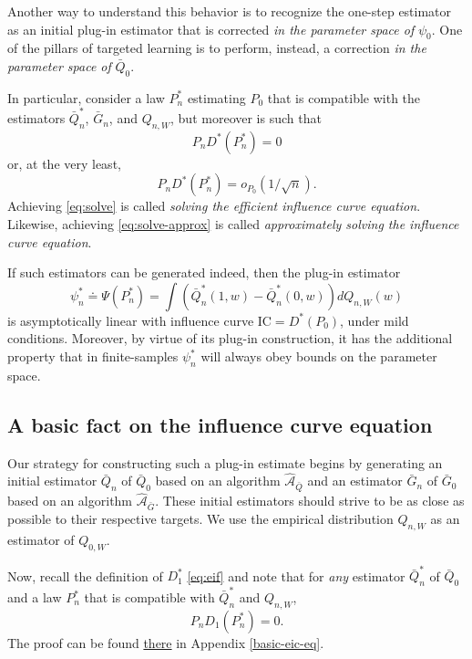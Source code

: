 \documentclass[11pt,openright,twoside]{book}
\newcommand{\Algo}{\widehat{\mathcal{A}}}
\newcommand{\defq}{\doteq}
\newcommand{\IC}{\textrm{IC}}
\newcommand{\Gbar}{\bar{G}}
\newcommand{\Qbar}{\bar{Q}}
\theoremstyle{definition}
\theoremstyle{definition}
\theoremstyle{definition}
\theoremstyle{remark}
\begin{document}
Another way to understand this behavior is to recognize the one-step estimator
as an initial plug-in estimator that is corrected \emph{in the parameter space of}
\(\psi_0\). One of the pillars of targeted learning is to perform, instead, a
correction \emph{in the parameter space of} \(\Qbar_0\).

In particular, consider a law \(P_{n}^{*}\) estimating \(P_{0}\) that is
compatible with the estimators \(\Qbar_n^*\), \(\Gbar_n\), and \(Q_{n,W}\), but
moreover is such that
\begin{equation} 
P_n  D^*(P_{n}^*)  = 0 \label{eq:solve}
\end{equation}
or, at the very least,
\begin{equation} 
P_n D^*(P_{n}^*) = o_{P_0}(1/\sqrt{n}). \label{eq:solve-approx} 
\end{equation}
Achieving \eqref{eq:solve} is called \emph{solving the efficient influence curve
equation}. Likewise, achieving \eqref{eq:solve-approx} is called
\emph{approximately solving the influence curve equation}.

If such estimators can be generated indeed, then the plug-in estimator
\begin{equation*}     \psi_n^*    \defq     \Psi(P_{n}^{*})    =     \int
\left(\Qbar_n^*(1,w)  - \Qbar_n^*(0,w)\right)  dQ_{n,W}(w) \end{equation*} is
asymptotically linear with influence curve \(\IC = D^{*}(P_{0})\), under mild
conditions. Moreover, by virtue of its plug-in construction, it has the
additional property that in finite-samples \(\psi_n^*\) will always obey bounds
on the parameter space.

\hypertarget{basic-fact}{%
\subsection{A basic fact on the influence curve equation}\label{basic-fact}}

Our strategy for constructing such a plug-in estimate begins by generating an
initial estimator \(\Qbar_n\) of \(\Qbar_0\) based on an algorithm \(\Algo_{\Qbar}\)
and an estimator \(\Gbar_n\) of \(\Gbar_0\) based on an algorithm \(\Algo_{\Gbar}\).
These initial estimators should strive to be as close as possible to their
respective targets. We use the empirical distribution \(Q_{n,W}\) as an
estimator of \(Q_{0,W}\).

Now, recall the definition of \(D_{1}^{*}\) \eqref{eq:eif} and note that for
\emph{any} estimator \(\Qbar_n^*\) of \(\Qbar_0\) and a law \(P_n^{*}\) that is
compatible with \(\Qbar_n^*\) and \(Q_{n,W}\), \begin{equation*}  P_{n}  D_{1}
(P_{n}^{*}) = 0.
\end{equation*}
The proof can be found \protect\hyperlink{basic-eic-eq}{there} in Appendix \ref{basic-eic-eq}.
\end{document}
